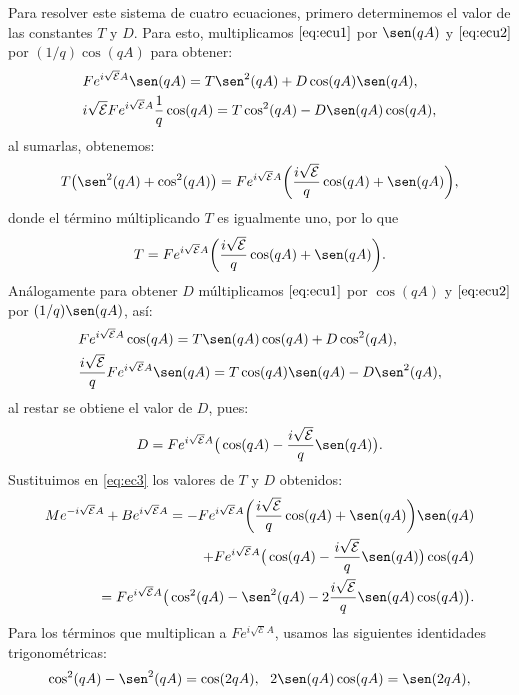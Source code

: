 \documentclass[12pt]{article}
\theoremstyle{definition}
\begin{document}
Para resolver este sistema de cuatro ecuaciones, primero  determinemos el valor de las constantes $T$ y $D$. Para esto, multiplicamos $\eqref{eq:ecu1}$ por $\sen(qA)$ y $\eqref{eq:ecu2}$  por $(1/q)\cos(qA)$ para obtener:
\begin{align*}
    &
    Fe^{i\sqrt{\mathcal{E}}A}\sen(qA) = T\sen^2(qA) + D\cos(qA)\sen(qA) ,
    \\
    &
    i\sqrt{\mathcal{E}}Fe^{i\sqrt{\mathcal{E}}A}\dfrac{1}{q}\cos(qA) = T\cos^2(qA)-D\sen(qA)\cos(qA) ,
\end{align*}
al sumarlas, obtenemos:
\begin{align*}
    T\big(\sen^2(qA)+\cos^2(qA)\big) = Fe^{i\sqrt{\mathcal{E}}A}
    \bigg(\dfrac{i\sqrt{\mathcal{E}}}{q}\cos(qA) + \sen(qA)\bigg),
\end{align*}
donde el término múltiplicando $T$ es igualmente uno, por lo que
\begin{align*}
    T = Fe^{i\sqrt{\mathcal{E}}A}
    \bigg(\dfrac{i\sqrt{\mathcal{E}}}{q}\cos(qA) + \sen(qA)\bigg).
\end{align*}
Análogamente para obtener $D$ múltiplicamos $\eqref{eq:ecu1}$  por $\cos(qA)$ y $\eqref{eq:ecu2}$  por $(1/q)\sen(qA)$, así:
\begin{align*}
    &
    Fe^{i\sqrt{\mathcal{E}}A}\cos(qA) = T\sen(qA)\cos(qA) + D\cos^2(qA) ,
    \\
    &
    \frac{i\sqrt{\mathcal{E}}}{q}Fe^{i\sqrt{\mathcal{E}}A}\sen(qA)=  T\cos(qA)\sen(qA)-D\sen^2(qA),
\end{align*}
al restar se obtiene el valor de $D$, pues:
\begin{align*}
    D = Fe^{i\sqrt{\mathcal{E}}A}\big(\cos(qA) - \frac{i\sqrt{\mathcal{E}}}{q}\sen(qA)\big).
\end{align*}
Sustituimos en \eqref{eq:ec3} los valores de $T$ y $D$ obtenidos:
\begin{align*}
    Me^{-i\sqrt{\mathcal{E}}A}+Be^{i\sqrt{\mathcal{E}}A} = -Fe^{i\sqrt{\mathcal{E}}A}
    \bigg(\dfrac{i\sqrt{\mathcal{E}}}{q}\cos(qA) + \sen(qA)\bigg)\sen(qA)
    \\
    +
    Fe^{i\sqrt{\mathcal{E}}A}\big(\cos(qA) - \frac{i\sqrt{\mathcal{E}}}{q}\sen(qA)\big)\cos(qA)
    \\
    =
    Fe^{i\sqrt{\mathcal{E}}A}\big(\cos^2(qA)-\sen^2(qA) -2\dfrac{i\sqrt{\mathcal{E}}}{q}\sen(qA)\cos(qA)\big).
\end{align*}
Para los términos que multiplican a $Fe^{i\sqrt{\mathcal{E}}A}$, usamos las siguientes identidades trigonométricas:
\begin{align}
   \cos^2(qA)-\sen^2(qA) = \cos(2qA), \:\:\: 2\sen(qA)\cos(qA)=\sen(2qA),
   \label{eq:IdentApoyo}
\end{align} 
\end{document}
